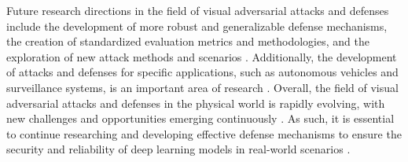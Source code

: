 \documentclass[11pt,a4paper]{article}
\begin{document}
Future research directions in the field of visual adversarial attacks and defenses include the development of more robust and generalizable defense mechanisms, the creation of standardized evaluation metrics and methodologies, and the exploration of new attack methods and scenarios \cite{doi:10.1109/access.2022.3216291}. Additionally, the development of attacks and defenses for specific applications, such as autonomous vehicles and surveillance systems, is an important area of research \cite{doi:10.1109/access.2023.3321118}. Overall, the field of visual adversarial attacks and defenses in the physical world is rapidly evolving, with new challenges and opportunities emerging continuously \cite{doi:10.58496/adsa/2024/011}. As such, it is essential to continue researching and developing effective defense mechanisms to ensure the security and reliability of deep learning models in real-world scenarios \cite{doi:10.59247/csol.v2i1.73}.
\end{document}
